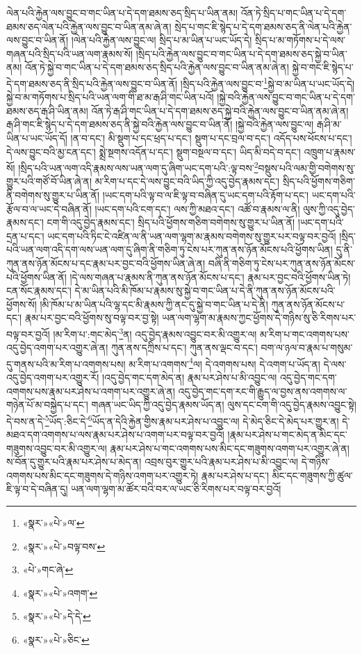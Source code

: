 ལེན་པའི་རྐྱེན་ལས་བྱུང་བ་གང་ཡིན་པ་དེ་དག་ཐམས་ཅད་སྲིད་པ་ཡིན་ནམ། འོན་ཏེ་སྲིད་པ་གང་ཡིན་པ་དེ་དག་ཐམས་ཅད་ལེན་པའི་རྐྱེན་ལས་བྱུང་བ་ཡིན་ནམ་ཞེ་ན། སྲེད་པ་གང་ཇི་སྙེད་པ་དེ་དག་ཐམས་ཅད་ནི་ལེན་པའི་རྐྱེན་ལས་བྱུང་བ་ཡིན་ནོ། །ལེན་པའི་རྐྱེན་ལས་བྱུང་ལ། སྲིད་པ་མ་ཡིན་པ་ཡང་ཡོད་དེ། སྲིད་པ་མ་གཏོགས་པ་དེ་ལས་གཞན་པའི་སྲིད་པའི་ཡན་ལག་རྣམས་སོ། །སྲིད་པའི་རྐྱེན་ལས་བྱུང་བ་གང་ཡིན་པ་དེ་དག་ཐམས་ཅད་སྐྱེ་བ་ཡིན་ནམ། འོན་ཏེ་སྐྱེ་བ་གང་ཡིན་པ་དེ་དག་ཐམས་ཅད་སྲིད་པའི་རྐྱེན་ལས་བྱུང་བ་ཡིན་ནམ་ཞེ་ན། སྐྱེ་བ་གང་ཇི་སྙེད་པ་དེ་དག་ཐམས་ཅད་ནི་སྲིད་པའི་རྐྱེན་ལས་བྱུང་བ་ཡིན་ནོ། །སྲིད་པའི་རྐྱེན་ལས་བྱུང་བ་\footnote{«སྣར་»«པེ་»ལ་}སྐྱེ་བ་མ་ཡིན་པ་ཡང་ཡོད་དེ། སྐྱེ་བ་མ་གཏོགས་པ་སྲིད་པའི་ཡན་ལག་གི་ཐ་མ་རྒ་ཤི་གང་ཡིན་པའོ། །སྐྱེ་བའི་རྐྱེན་ལས་བྱུང་བ་གང་ཡིན་པ་དེ་དག་ཐམས་ཅད་རྒ་ཤི་ཡིན་ནམ། འོན་ཏེ་རྒ་ཤི་གང་ཡིན་པ་དེ་དག་ཐམས་ཅད་སྐྱེ་བའི་རྐྱེན་ལས་བྱུང་བ་ཡིན་ནམ་ཞེ་ན། རྒ་ཤི་གང་ཇི་སྙེད་པ་དེ་དག་ཐམས་ཅད་ནི་སྐྱེ་བའི་རྐྱེན་ལས་བྱུང་བ་ཡིན་ནོ། །སྐྱེ་བའི་རྐྱེན་ལས་བྱུང་ལ། རྒ་ཤི་མ་ཡིན་པ་ཡང་ཡོད་དོ། །ན་བ་དང་། མི་སྡུག་པ་དང་ཕྲད་པ་དང་། སྡུག་པ་དང་བྲལ་བ་དང་། འདོད་པས་ཕོངས་པ་དང་། དེ་ལས་བྱུང་བའི་མྱ་ངན་དང་། སྨྲེ་སྔགས་འདོན་པ་དང་། སྡུག་བསྔལ་བ་དང་། ཡིད་མི་བདེ་བ་དང་། འཁྲུག་པ་རྣམས་སོ། །སྲིད་པའི་ཡན་ལག་འདི་རྣམས་ལས་ཡན་ལག་དུ་ཞིག་ཡང་དག་པའི་:ལྟ་བས་\footnote{«སྣར་»«པེ་»བལྟ་བས་}བསྡུས་པའི་ལམ་གྱི་བགེགས་སུ་གྱུར་པའི་གཙོ་བོ་ཡིན་ཞེ་ན། མ་རིག་པ་དང་དེ་ལས་བྱུང་བའི་ཡིད་ཀྱི་འདུ་བྱེད་རྣམས་དང་། སྲིད་པའི་ཕྱོགས་གཅིག་ནི་བགེགས་སུ་གྱུར་པ་ཡིན་ནོ། །ཡང་དག་པའི་ལྟ་བ་ལ་ཇི་ལྟ་བ་བཞིན་དུ་ཡང་དག་པའི་རྟོག་པ་དང་། ཡང་དག་པའི་རྩོལ་བ་ལ་ཡང་དེ་བཞིན་ནོ། །ཡང་དག་པའི་ངག་དང་། ལས་ཀྱི་མཐའ་དང་། འཚོ་བ་རྣམས་ལ་ནི། ལུས་ཀྱི་འདུ་བྱེད་རྣམས་དང་། ངག་གི་འདུ་བྱེད་རྣམས་དང་། སྲིད་པའི་ཕྱོགས་གཅིག་བགེགས་སུ་གྱུར་པ་ཡིན་ནོ། །ཡང་དག་པའི་དྲན་པ་དང་། ཡང་དག་པའི་ཏིང་ངེ་འཛིན་ལ་ནི་ཡན་ལག་ལྷག་མ་རྣམས་བགེགས་སུ་གྱུར་པར་བལྟ་བར་བྱའོ། །སྲིད་པའི་ཡན་ལག་འདི་དག་ལས་ཡན་ལག་དུ་ཞིག་ནི་གཅིག་ཏུ་ངེས་པར་ཀུན་ནས་ཉོན་མོངས་པའི་ཕྱོགས་ཡིན། དུ་ནི་ཀུན་ནས་ཉོན་མོངས་པ་དང་རྣམ་པར་བྱང་བའི་ཕྱོགས་ཡིན་ཞེ་ན། བཞི་ནི་གཅིག་ཏུ་ངེས་པར་ཀུན་ནས་ཉོན་མོངས་པའི་ཕྱོགས་ཡིན་ནོ། །དེ་ལས་གཞན་པ་རྣམས་ནི་ཀུན་ནས་ཉོན་མོངས་པ་དང་། རྣམ་པར་བྱང་བའི་ཕྱོགས་ཡིན་ཏེ། ངན་སོང་རྣམས་དང་། དེ་མ་ཡིན་པའི་མི་ཁོམ་པ་རྣམས་སུ་སྐྱེ་བ་གང་ཡིན་པ་དེ་ནི་ཀུན་ནས་ཉོན་མོངས་པའི་ཕྱོགས་སོ། །མི་ཁོམ་པ་མ་ཡིན་པའི་ལྷ་དང་མི་རྣམས་ཀྱི་ནང་དུ་སྐྱེ་བ་གང་ཡིན་པ་དེ་ནི། ཀུན་ནས་ཉོན་མོངས་པ་དང་། རྣམ་པར་བྱང་བའི་ཕྱོགས་སུ་བལྟ་བར་བྱ་སྟེ། ཡན་ལག་ལྷག་མ་རྣམས་ཀྱང་ཕྱོགས་དེ་གཉིས་སུ་ཅི་རིགས་པར་བལྟ་བར་བྱའོ། །མ་རིག་པ་:གང་མེད་\footnote{«པེ་»གང་ཞེ་}ན། འདུ་བྱེད་རྣམས་འབྱུང་བར་མི་འགྱུར་ལ། མ་རིག་པ་གང་འགགས་པས་འདུ་བྱེད་འགག་པར་འགྱུར་ཞེ་ན། ཀུན་ནས་དཀྲིས་པ་དང་། ཀུན་ནས་ལྡང་བ་དང་། བག་ལ་ཉལ་བ་རྣམ་པ་གསུམ་དུ་གནས་པའི་མ་རིག་པ་འགགས་པས། མ་རིག་པ་འགགས་\footnote{«སྣར་»«པེ་»འགག་}ལ། དེ་འགགས་པས། དེ་འགག་པ་ཡོད་ན། དེ་ལས་འདུ་བྱེད་འགག་པར་འགྱུར་རོ། །འདུ་བྱེད་གང་དག་མེད་ན། རྣམ་པར་ཤེས་པ་མི་འབྱུང་ལ། འདུ་བྱེད་གང་དག་འགགས་པས་རྣམ་པར་ཤེས་པ་འགག་པར་འགྱུར་ཞེ་ན། འདུ་བྱེད་གང་དག་རང་གི་རྒྱུད་ལ་བྱས་ནས་འགགས་ལ་གཉེན་པོ་མ་བསྐྱེད་པ་དང་། གཞན་ཡང་ཡིད་ཀྱི་འདུ་བྱེད་རྣམས་ཡོད་ན། ལུས་དང་ངག་གི་འདུ་བྱེད་རྣམས་འབྱུང་སྟེ། དེ་བས་ན་དེ་\footnote{«སྣར་»«པེ་»དེ་དེ་}ཡོད་:ཅིང་དེ་\footnote{«སྣར་»«པེ་»ཅིང་}ཡོད་ན་དེའི་རྐྱེན་གྱིས་རྣམ་པར་ཤེས་པ་འབྱུང་ལ། དེ་མེད་ཅིང་དེ་མེད་པར་གྱུར་ན། དེ་མཐའ་དག་འགགས་པ་ལས་རྣམ་པར་ཤེས་པ་འགག་པར་བལྟ་བར་བྱའོ། །རྣམ་པར་ཤེས་པ་གང་མེད་ན་མིང་དང་གཟུགས་འབྱུང་བར་མི་འགྱུར་ལ། རྣམ་པར་ཤེས་པ་གང་འགགས་པས་མིང་དང་གཟུགས་འགག་པར་འགྱུར་ཞེ་ན། ས་བོན་དུ་གྱུར་པའི་རྣམ་པར་ཤེས་པ་མེད་ན། འབྲས་བུར་གྱུར་པའི་རྣམ་པར་ཤེས་པ་མི་འབྱུང་ལ། དེ་གཉིས་འགགས་པས་མིང་དང་གཟུགས་དེ་གཉིས་འགག་པར་འགྱུར་ཏེ། རྣམ་པར་ཤེས་པ་དང་། མིང་དང་གཟུགས་ཀྱི་ཚུལ་ཇི་ལྟ་བ་དེ་བཞིན་དུ། ཡན་ལག་ལྷག་མ་ཚོར་བའི་བར་ལ་ཡང་ཅི་རིགས་པར་བལྟ་བར་བྱའོ། 
